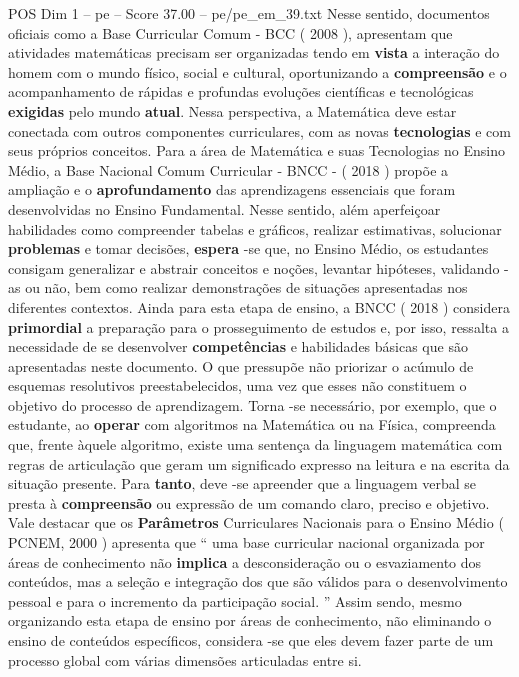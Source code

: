 \begin{textsample}{POS Dim 1 – pe – Score 37.00 – pe/pe\_em\_39.txt}
Nesse sentido, documentos oficiais como a Base Curricular Comum - BCC ( 2008 ), apresentam que atividades matemáticas precisam ser organizadas tendo em \textbf{vista} a interação do homem com o mundo físico, social e cultural, oportunizando a \textbf{compreensão} e o acompanhamento de rápidas e profundas evoluções científicas e tecnológicas \textbf{exigidas} pelo mundo \textbf{atual}.
Nessa perspectiva, a Matemática deve estar conectada com outros componentes curriculares, com as novas \textbf{tecnologias} e com seus próprios conceitos.
Para a área de Matemática e suas Tecnologias no Ensino Médio, a Base Nacional Comum Curricular - BNCC - ( 2018 ) propõe a ampliação e o \textbf{aprofundamento} das aprendizagens essenciais que foram desenvolvidas no Ensino Fundamental.
Nesse sentido, além aperfeiçoar habilidades como compreender tabelas e gráficos, realizar estimativas, solucionar \textbf{problemas} e tomar decisões, \textbf{espera} -se que, no Ensino Médio, os estudantes consigam generalizar e abstrair conceitos e noções, levantar hipóteses, validando -as ou não, bem como realizar demonstrações de situações apresentadas nos diferentes contextos.
Ainda para esta etapa de ensino, a BNCC ( 2018 ) considera \textbf{primordial} a preparação para o prosseguimento de estudos e, por isso, ressalta a necessidade de se desenvolver \textbf{competências} e habilidades básicas que são apresentadas neste documento.
O que pressupõe não priorizar o acúmulo de esquemas resolutivos preestabelecidos, uma vez que esses não constituem o objetivo do processo de aprendizagem.
Torna -se necessário, por exemplo, que o estudante, ao \textbf{operar} com algoritmos na Matemática ou na Física, compreenda que, frente àquele algoritmo, existe uma sentença da linguagem matemática com regras de articulação que geram um significado expresso na leitura e na escrita da situação presente.
Para \textbf{tanto}, deve -se apreender que a linguagem verbal se presta à \textbf{compreensão} ou expressão de um comando claro, preciso e objetivo.
Vale destacar que os \textbf{Parâmetros} Curriculares Nacionais para o Ensino Médio ( PCNEM, 2000 ) apresenta que “ uma base curricular nacional organizada por áreas de conhecimento não \textbf{implica} a desconsideração ou o esvaziamento dos conteúdos, mas a seleção e integração dos que são válidos para o desenvolvimento pessoal e para o incremento da participação social. ” Assim sendo, mesmo organizando esta etapa de ensino por áreas de conhecimento, não eliminando o ensino de conteúdos específicos, considera -se que eles devem fazer parte de um processo global com várias dimensões articuladas entre si.

\end{textsample}
